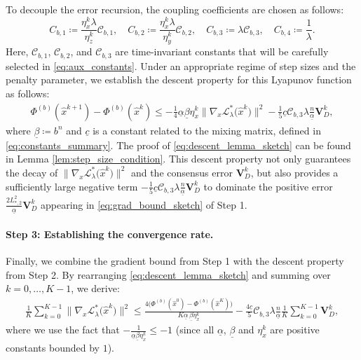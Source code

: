 \documentclass{article}
\theoremstyle{plain}
\theoremstyle{definition}
\theoremstyle{remark}
\begin{document}
To decouple the error recursion, the coupling coefficients are chosen as follows: 
\begin{equation}\label{eq:coeff_def_sketch}
    C_{b,1} \coloneqq \frac{\eta_{x}^{k}\lambda}{\eta_{z}^{k}}\mathcal{C}_{b,1}, \quad
    C_{b,2} \coloneqq \frac{\eta_{x}^{k}\lambda}{\eta_{y}^{k}} \mathcal{C}_{b,2}, \quad
    C_{b,3} \coloneqq \lambda \mathcal{C}_{b,3}, \quad
    C_{b,4} \coloneqq \frac{1}{\lambda}.
\end{equation}
Here, $\mathcal{C}_{b,1}$, $\mathcal{C}_{b,2}$, and $\mathcal{C}_{b,3}$ are time-invariant constants that will be carefully selected in \eqref{eq:aux_constants}.  
Under an appropriate regime of step sizes and the penalty parameter, we establish the descent property for this Lyapunov function as follows: 
\begin{align}\label{eq:descent_lemma_sketch}
 \Phi^{(b)}({\hat{x}}^{k+1}) - \Phi^{(b)}({\hat{x}}^{k}) \leq - \frac{1}{4}\underline{\alpha} \underline{\beta}\eta_x^{k}\big\| \nabla_{x} \mathcal{L}_{\lambda}^{*}\big({\hat{x}}^k\big) \big\|^{2} - \frac{1}{5}\underline{c}\mathcal{C}_{b,3}\lambda\frac{n}{\underline{\alpha}} \mathbf{V}_{D}^{k},
\end{align}
where $\underline{\beta} \coloneqq b^n$ and $\underline{c}$ is a constant related to the mixing matrix, defined in  \eqref{eq:constants_summary}. 
The proof of \eqref{eq:descent_lemma_sketch} can be found in Lemma \ref{lem:step_size_condition}.
This descent property not only guarantees the decay of $\|\nabla_{x} \mathcal{L}_{\lambda}^{*}\big({\hat{x}}^k\big)\|^2$ and the consensus error $\mathbf{V}_D^{k}$, but also provides a sufficiently large negative term $- \frac{1}{5}\underline{c}\mathcal{C}_{b,3}\lambda\frac{n}{\underline{\alpha}} \mathbf{V}_{D}^{k}$ to dominate the positive error $\frac{2 L_{*,2}^{2}}{\underline{\alpha}}  \mathbf{V}_{D}^{k}$ appearing in \eqref{eq:grad_bound_sketch} of Step 1.

\paragraph{Step 3: Establishing the convergence rate.}
Finally, we combine the gradient bound from Step 1 with the descent property from Step 2. By rearranging \eqref{eq:descent_lemma_sketch} and summing over $k=0, \dots, K-1$, we derive:
\begin{align}\label{eq:sum_descent_sketch}
    \frac{1}{K}\sum_{k=0}^{K-1} \big\| \nabla_{x} \mathcal{L}_{\lambda}^{*}\big({\hat{x}}^k\big) \big\|^{2} \le \frac{4\big(\Phi^{(b)}({\hat{x}}^{0}) - \Phi^{(b)}({\hat{x}}^{K})\big) }{K \underline{\alpha}\,\underline{\beta}\eta_x^{k}} -\frac{4\underline{c}}{5}\mathcal{C}_{b,3}\lambda \frac{n}{\underline{\alpha}} \frac{1}{K}\sum_{k=0}^{K-1}\mathbf{V}_{D}^{k},
\end{align}
where we use the fact that $-\frac{1}{\underline{\alpha}\underline{\beta}\eta_{x}^{k}}\leq-1$ (since all $\underline{\alpha}$, $\underline{\beta}$ and $\eta_{x}^{k}$ are positive constants bounded by $1$). 
\end{document}
